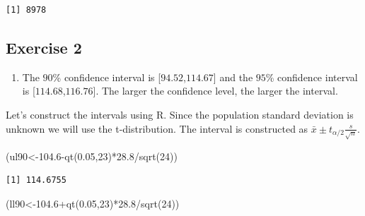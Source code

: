 \documentclass[
  letterpaper,
  DIV=11,
  numbers=noendperiod]{scrreprt}
\newenvironment{Shaded}{\begin{snugshade}}{\end{snugshade}}
\newcommand{\DecValTok}[1]{\textcolor[rgb]{0.68,0.00,0.00}{#1}}
\newcommand{\FloatTok}[1]{\textcolor[rgb]{0.68,0.00,0.00}{#1}}
\newcommand{\FunctionTok}[1]{\textcolor[rgb]{0.28,0.35,0.67}{#1}}
\newcommand{\NormalTok}[1]{\textcolor[rgb]{0.00,0.23,0.31}{#1}}
\newcommand{\OtherTok}[1]{\textcolor[rgb]{0.00,0.23,0.31}{#1}}
\newcommand{\SpecialCharTok}[1]{\textcolor[rgb]{0.37,0.37,0.37}{#1}}
\providecommand{\tightlist}{%
  \setlength{\itemsep}{0pt}\setlength{\parskip}{0pt}}\usepackage{longtable,booktabs,array}
\begin{document}
\begin{verbatim}
[1] 8978
\end{verbatim}

\hypertarget{exercise-2-23}{%
\subsection*{Exercise 2}\label{exercise-2-23}}

\begin{blackbox}

\begin{enumerate}
\def\labelenumi{\arabic{enumi}.}
\tightlist
\item
  The \(90\)\% confidence interval is {[}\(94.52\),\(114.67\){]} and the
  \(95\)\% confidence interval is {[}\(114.68\),\(116.76\){]}. The
  larger the confidence level, the larger the interval.
\end{enumerate}

\end{blackbox}

Let's construct the intervals using R. Since the population standard
deviation is unknown we will use the t-distribution. The interval is
constructed as \(\bar{x}\pm t_{\alpha/2} \frac{s}{\sqrt{n}}\).

\begin{Shaded}
\begin{Highlighting}[numbers=left,,]
\NormalTok{(ul90}\OtherTok{\textless{}{-}}\FloatTok{104.6}\SpecialCharTok{{-}}\FunctionTok{qt}\NormalTok{(}\FloatTok{0.05}\NormalTok{,}\DecValTok{23}\NormalTok{)}\SpecialCharTok{*}\FloatTok{28.8}\SpecialCharTok{/}\FunctionTok{sqrt}\NormalTok{(}\DecValTok{24}\NormalTok{))}
\end{Highlighting}
\end{Shaded}

\begin{verbatim}
[1] 114.6755
\end{verbatim}

\begin{Shaded}
\begin{Highlighting}[numbers=left,,]
\NormalTok{(ll90}\OtherTok{\textless{}{-}}\FloatTok{104.6}\SpecialCharTok{+}\FunctionTok{qt}\NormalTok{(}\FloatTok{0.05}\NormalTok{,}\DecValTok{23}\NormalTok{)}\SpecialCharTok{*}\FloatTok{28.8}\SpecialCharTok{/}\FunctionTok{sqrt}\NormalTok{(}\DecValTok{24}\NormalTok{))}
\end{Highlighting}
\end{Shaded}
\end{document}

